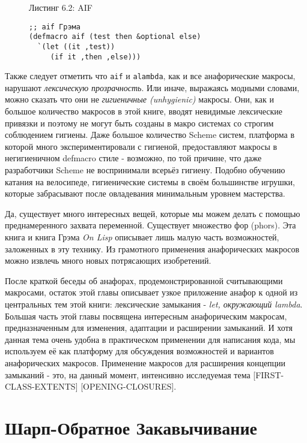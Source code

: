 \begin{figure}Листинг 6.2: AIF\label{listing_6.2}
\listbegin
\begin{verbatim}
;; aif Грэма
(defmacro aif (test then &optional else)
  `(let ((it ,test))
     (if it ,then ,else)))
\end{verbatim}
\listend
\end{figure}

Также следует отметить что \verb"aif" и \verb"alambda", как и все анафорические макросы, нарушают \emph{лексическую прозрачность}. Или иначе, выражаясь модными словами, можно сказать что они не \emph{гигиеничные (unhygienic)} макросы. Они, как и большое количество макросов в этой книге, вводят невидимые лексические привязки и поэтому не могут быть созданы в макро системах со строгим соблюдением гигиены. Даже большое количество Scheme систем, платформа в которой много экспериментировали с гигиеной, предоставляют макросы в негигиеничном defmacro стиле - возможно, по той причине, что даже разработчики Scheme не воспринимали всерьёз гигиену. Подобно обучению катания на велосипеде, гигиенические системы в своём большинстве игрушки, которые забрасывают после овладевания минимальным уровнем мастерства.

Да, существует много интересных вещей, которые мы можем делать с помощью преднамеренного захвата переменной. Существует множество фор (phors). Эта книга и книга Грэма \emph{On Lisp} описывает лишь малую часть возможностей, заложенных в эту технику. Из грамотного применения анафорических макросов можно извлечь много новых потрясающих изобретений.

После краткой беседы об анафорах, продемонстрированной считывающими макросами, остаток этой главы описывает узкое приложение анафор к одной из центральных тем этой книги: лексические замыкания - \emph{let, окружающий lambda}. Большая часть этой главы посвящена интересным анафорическим макросам, предназначенным для изменения, адаптации и расширении замыканий. И хотя данная тема очень удобна в практическом применении для написания кода, мы используем её как платформу для обсуждения возможностей и вариантов анафорических макросов. Применение макросов для расширения концепции замыканий - это, на данный момент, интенсивно исследуемая тема [FIRST-CLASS-EXTENTS] [OPENING-CLOSURES].

\section{Шарп-Обратное Закавычивание}\label{section_sharp-backquote} 

